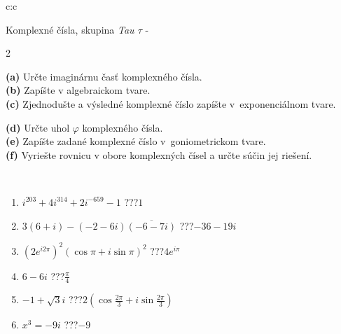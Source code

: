 \documentclass[10pt]{report}
\begin{document}
\begin{tabular}{c:c}
\begin{minipage}[c][104.5mm][t]{0.5\linewidth}
\begin{center}
\vspace{7mm}
{\huge Komplexné čísla, skupina \textit{Tau $\tau$} -}\\[5mm]
\begin{minipage}{0.95\linewidth}
\begin{center}
{\small \begin{multicols}{2} \raggedright
\textbf{(a)} Určte imaginárnu časť komplexného čísla. \\[1mm]
\textbf{(b)} Zapíšte v algebraickom tvare. \\[1mm]
\textbf{(c)} Zjednodušte a výsledné komplexné číslo zapíšte v~exponenciálnom tvare. \par \columnbreak
\textbf{(d)} Určte uhol \(\varphi\) komplexného čísla. \\[1mm]
\textbf{(e)} Zapíšte zadané komplexné číslo v~goniometrickom tvare. \\[1mm]
\textbf{(f)} Vyriešte rovnicu v obore komplexných čísel a určte súčin jej riešení.
\end{multicols}
}
\end{center}
\end{minipage}
\\[4mm]
\begin{minipage}{0.79\linewidth}
\begin{center}
\begin{varwidth}{\linewidth}
\begin{enumerate}
\large
\item $i^{203}+4i^{314}+2i^{-659}-1$\quad \dotfill\; ???\;\dotfill \quad $1$
\item $3(6+i)-(-2-6i)\overline{(-6-7i)}$\quad \dotfill\; ???\;\dotfill \quad $-36-19i$
\item $\left(2e^{i2\pi}\right)^{2}\left(\cos{\pi}+i\sin{\pi}\right)^{2}$\quad \dotfill\; ???\;\dotfill \quad $4e^{i\pi}$
\item $6-6i$\quad \dotfill\; ???\;\dotfill \quad $\frac{\pi}{4}$
\item $-1+\sqrt{3}i$\quad \dotfill\; ???\;\dotfill \quad $2\left(\cos{\frac{2\pi}{3}}+i\sin{\frac{2\pi}{3}}\right)$
\item $x^3=-9i$\quad \dotfill\; ???\;\dotfill \quad $-9$
\end{enumerate}
\end{varwidth}
\end{center}

\end{minipage}
\end{center}
\end{minipage}
\end{tabular}
\end{document}
